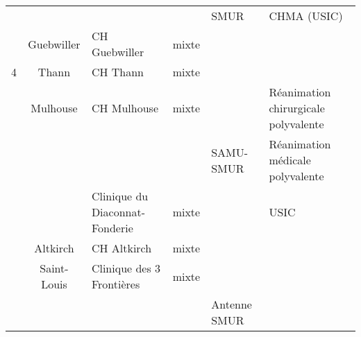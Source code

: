 \documentclass[a4paper,8pt]{article}
\begin{document}
\begin{table}[htbp]
\begin{turn}{90}
\begin{tabular}{|l|c|l|l|l|l|}
\multicolumn{ 1}{|l|}{} & \multicolumn{ 1}{c|}{} & \multicolumn{ 1}{l|}{} &  & SMUR & CHMA (USIC) \\ \cline{ 2- 6}
\multicolumn{ 1}{|l|}{} & Guebwiller & CH Guebwiller & mixte &  &  \\ \hline
\multicolumn{ 1}{|c|}{4} & Thann & CH Thann & mixte &  &  \\ \cline{ 2- 6}
\multicolumn{ 1}{|l|}{} & \multicolumn{ 1}{c|}{Mulhouse} & \multicolumn{ 1}{l|}{CH Mulhouse} & mixte &  & Réanimation chirurgicale polyvalente \\ \cline{ 4- 6}
\multicolumn{ 1}{|l|}{} & \multicolumn{ 1}{c|}{} & \multicolumn{ 1}{l|}{} &  & SAMU-SMUR & Réanimation médicale polyvalente \\ \cline{ 3- 6}
\multicolumn{ 1}{|l|}{} & \multicolumn{ 1}{c|}{} & Clinique du Diaconnat-Fonderie & mixte &  & USIC \\ \cline{ 2- 6}
\multicolumn{ 1}{|l|}{} & Altkirch & CH Altkirch & mixte &  &  \\ \cline{ 2- 6}
\multicolumn{ 1}{|l|}{} & \multicolumn{ 1}{c|}{Saint-Louis} & Clinique des 3 Frontières & mixte &  &  \\ \cline{ 3- 6}
\multicolumn{ 1}{|l|}{} & \multicolumn{ 1}{c|}{} &  &  & Antenne SMUR &  \\ \hline
\end{tabular}
\end{turn}
\label{table_urgence}
\end{table}
\end{document}
